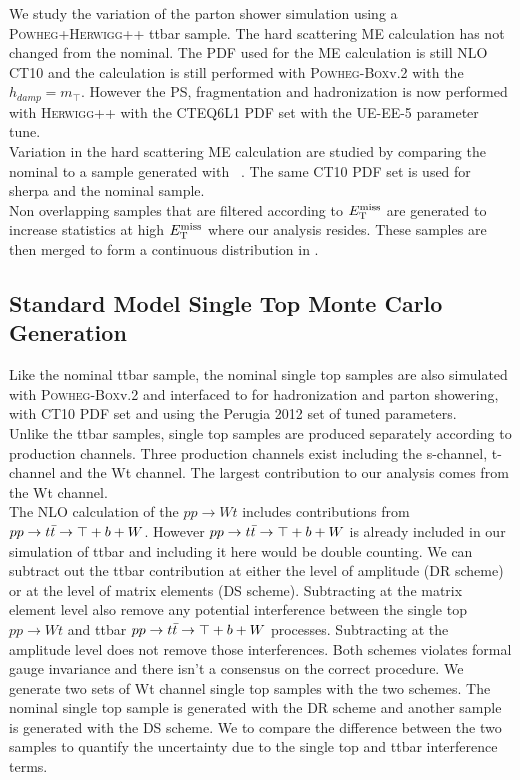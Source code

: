 \indent We study the variation of the parton shower simulation using a \textsc{Powheg+Herwigg++} ttbar sample.  The hard scattering ME calculation has not changed from the nominal.  The PDF used for the ME calculation is still NLO CT10 and the calculation is still performed with \textsc{Powheg-Box}v.2 with the $h_{damp} = m_{\top}$.  However the PS, fragmentation and hadronization is now performed with \textsc{Herwigg++} with the CTEQ6L1 PDF set \cite{CTEQ6L1} with the UE-EE-5 parameter tune. \\

\indent Variation in the hard scattering ME calculation are studied by comparing the nominal to a sample generated with \sherpa~\cite{sherpa}.  The same CT10 PDF set is used for sherpa and the nominal sample. \\ 

\indent Non overlapping samples that are filtered according to $E_{\mathrm{T}}^{\mathrm{miss}}$ are generated to increase statistics at high $E_{\mathrm{T}}^{\mathrm{miss}}$ where our analysis resides.  These samples are then merged to form a  continuous distribution in \MET. \\

\subsection{Standard Model Single Top Monte Carlo Generation}

\indent Like the nominal ttbar sample, the nominal single top samples are also simulated with \textsc{Powheg-Box}v.2 and interfaced to  for hadronization and parton showering, with CT10 PDF set and using the Perugia 2012 set \cite{Perugia2012} of tuned parameters. \\

\indent Unlike the ttbar samples, single top samples are produced separately according to production channels.  Three production channels exist including the s-channel, t-channel and the Wt channel.  The largest contribution to our analysis comes from the Wt channel.  \\

\indent The NLO calculation of the $pp \rightarrow Wt$ includes contributions from $ pp \rightarrow t\bar{t} \rightarrow \top + b + W$.  However $ pp \rightarrow t\bar{t} \rightarrow \top + b + W$ is already included in our simulation of ttbar and including it here would be double counting.  We can subtract out the ttbar contribution at either the level of amplitude (DR scheme) or at the level of matrix elements (DS scheme).  Subtracting at the matrix element level also remove any potential interference between the single top $pp \rightarrow Wt$ and ttbar $ pp \rightarrow t\bar{t} \rightarrow \top + b + W$ processes.  Subtracting at the amplitude level does not remove those interferences.  Both schemes violates formal gauge invariance and there isn't a consensus on the correct procedure.  We generate two sets of Wt channel single top samples with the two schemes.  The nominal single top sample is generated with the DR scheme and another sample is generated with the DS scheme.  We to compare the difference between the two samples to quantify the uncertainty due to the single top and ttbar interference terms. \\

